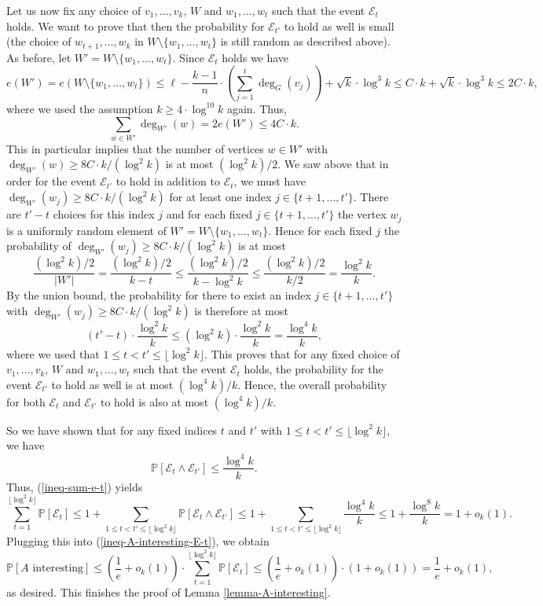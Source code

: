 \documentclass[11pt]{article}
\theoremstyle{definition}
\numberwithin{equation}{section}
\begin{document}
Let us now fix any choice of $v_1,\dots,v_k$, $W$ and $w_1,\dots,w_t$ such that the event $\mathscr{E}_t$ holds. We want to prove that then the probability for $\mathscr{E}_{t'}$ to hold as well is small (the choice of $w_{t+1},\dots,w_k$ in $W\setminus \lbrace w_1,\dots,w_t\rbrace$ is still random as described above). As before, let $W'=W\setminus \lbrace w_1,\dots,w_t\rbrace$. Since $\mathscr{E}_t$ holds we have
\[e(W')=e(W\setminus \lbrace w_1,\dots,w_t\rbrace)\leq \ell-\frac{k-1}{n}\cdot\left(\sum_{j=1}^{t}\deg_G(v_j)\right)+\sqrt{k}\cdot \log^3 k\leq C\cdot k+\sqrt{k}\cdot \log^3 k\leq 2C\cdot k,\]
where we used the assumption $k\geq 4\cdot \log^{10} k$ again. Thus,
\[\sum_{w\in W'}\deg_{W'}(w)=2e(W')\leq 4C\cdot k.\]
This in particular implies that the number of vertices $w\in W'$ with $\deg_{W'}(w)\geq 8C\cdot k/(\log^2 k)$ is at most $(\log^2 k)/2$. We saw above that in order for the event $\mathscr{E}_{t'}$ to hold in addition to $\mathscr{E}_{t}$, we must have $\deg_{W'}(w_j)\geq 8C\cdot k/(\log^2 k)$ for at least one index $j\in \lbrace t+1,\dots,t'\rbrace$. There are $t'-t$ choices for this index $j$ and for each fixed $j\in \lbrace t+1,\dots,t'\rbrace$ the vertex $w_j$ is a uniformly random element of $W'=W\setminus \lbrace w_1,\dots,w_t\rbrace$. Hence for each fixed $j$ the probability of $\deg_{W'}(w_j)\geq 8C\cdot k/(\log^2 k)$ is at most
\[\frac{(\log^2 k)/2}{\vert W'\vert}=\frac{(\log^2 k)/2}{k-t}\leq \frac{(\log^2 k)/2}{k-\log^2 k}\leq \frac{(\log^2 k)/2}{k/2}=\frac{\log^2 k}{k}.\]
By the union bound, the probability for there to exist an index $j\in \lbrace t+1,\dots,t'\rbrace$ with $\deg_{W'}(w_j)\geq 8C\cdot k/(\log^2 k)$ is therefore at most
\[(t'-t)\cdot \frac{\log^2 k}{k}\leq (\log^2 k)\cdot \frac{\log^2 k}{k}=\frac{\log^4 k}{k},\]
where we used that $1\leq t<t'\leq \lfloor\log^2 k\rfloor$. This proves that for any fixed choice of $v_1,\dots,v_k$, $W$ and $w_1,\dots,w_t$ such that the event $\mathscr{E}_t$ holds, the probability for the event $\mathscr{E}_{t'}$ to hold as well is at most $(\log^4 k)/k$. Hence, the overall probability for both $\mathscr{E}_t$ and $\mathscr{E}_{t'}$ to hold is also at most $(\log^4 k)/k$.

So we have shown that for any fixed indices $t$ and $t'$ with $1\leq t<t'\leq \lfloor\log^2 k\rfloor$, we have
\[\mathbb{P}[\mathscr{E}_t\wedge\mathscr{E}_{t'}]\leq \frac{\log^4 k}{k}.\]
Thus, (\ref{ineq-sum-e-t}) yields
\[\sum_{t=1}^{\lfloor\log^2 k\rfloor} \mathbb{P}[\mathscr{E}_t]\leq 1+\sum_{1\leq t<t'\leq \lfloor\log^2 k\rfloor}\mathbb{P}[\mathscr{E}_t\wedge\mathscr{E}_{t'}]\leq 1+\sum_{1\leq t<t'\leq \lfloor\log^2 k\rfloor}\frac{\log^4 k}{k}\leq 1+\frac{\log^8 k}{k}=1+o_k(1).\]
Plugging this into (\ref{ineq-A-interesting-E-t}), we obtain
\[\mathbb{P}\left[A\text{ interesting}\right]\leq \left(\frac{1}{e}+o_k(1)\right)\cdot \sum_{t=1}^{\lfloor\log^2 k\rfloor} \mathbb{P}[\mathscr{E}_t]\leq \left(\frac{1}{e}+o_k(1)\right)\cdot (1+o_k(1))=\frac{1}{e}+o_k(1),\]
as desired. This finishes the proof of Lemma \ref{lemma-A-interesting}.
\end{document}
